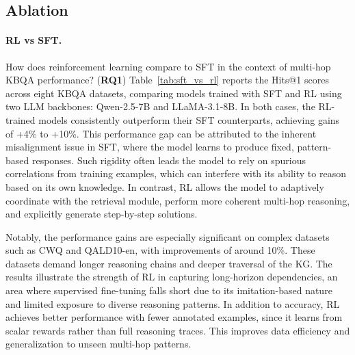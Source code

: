 \documentclass[10pt,conference]{IEEEtran}
\begin{document}
\subsection{Ablation}

\paragraph{RL vs SFT.} How does reinforcement learning compare to SFT in the context of multi-hop KBQA performance?
(\textbf{RQ1})
Table~\ref{tab:sft_vs_rl} reports the Hits@1 scores across eight KBQA datasets, comparing models trained with SFT and RL using two LLM backbones: Qwen-2.5-7B and LLaMA-3.1-8B. In both cases, the RL-trained models consistently outperform their SFT counterparts, achieving gains of +4\% to +10\%. 
This performance gap can be attributed to the inherent misalignment issue \cite{wang2024math} in SFT, where the model learns to produce fixed, pattern-based responses. Such rigidity often leads the model to rely on spurious correlations from training examples, which can interfere with its ability to reason based on its own knowledge. In contrast, RL allows the model to adaptively coordinate with the retrieval module, perform more coherent multi-hop reasoning, and explicitly generate step-by-step solutions. 

Notably, the performance gains are especially significant on complex datasets such as CWQ and QALD10-en, with improvements of around 10\%. These datasets demand longer reasoning chains and deeper traversal of the KG. 
The results illustrate the strength of RL in capturing long-horizon dependencies, an area where supervised fine-tuning falls short due to its imitation-based nature and limited exposure to diverse reasoning patterns. 
In addition to accuracy, RL achieves better performance with fewer annotated examples, since it learns from scalar rewards rather than full reasoning traces. 
This improves data efficiency and generalization to unseen multi-hop patterns.
\end{document}
